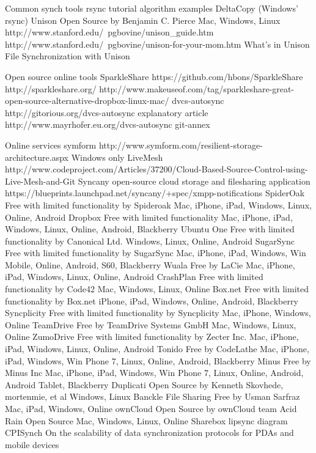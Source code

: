 		Common synch tools
			rsync
				tutorial
				algorithm 
				examples
			DeltaCopy (Windows' rsync)		
			Unison
				Open Source by Benjamin C. Pierce 
				Mac, Windows, Linux
				http://www.stanford.edu/~pgbovine/unison_guide.htm
				http://www.stanford.edu/~pgbovine/unison-for-your-mom.htm
				What’s in Unison
				File Synchronization with Unison
				
		Open source online tools
			SparkleShare 
				https://github.com/hbons/SparkleShare
				http://sparkleshare.org/
				http://www.makeuseof.com/tag/sparkleshare-great-open-source-alternative-dropbox-linux-mac/
			dvcs-autosync
				http://gitorious.org/dvcs-autosync
				explanatory article
				http://www.mayrhofer.eu.org/dvcs-autosync
			git-annex
		
		
		Online services
			symform
			http://www.symform.com/resilient-storage-architecture.aspx
				Windows only
			LiveMesh 
				http://www.codeproject.com/Articles/37200/Cloud-Based-Source-Control-using-Live-Mesh-and-Git
			Syncany
				open-source cloud storage and filesharing application
				https://blueprints.launchpad.net/syncany/+spec/xmpp-notifications 
			SpiderOak
				Free with limited functionality by Spideroak
				Mac, iPhone, iPad, Windows, Linux, Online, Android
			Dropbox
				Free with limited functionality 
				Mac, iPhone, iPad, Windows, Linux, Online, Android, Blackberry
			Ubuntu One
				Free with limited functionality by Canonical Ltd. 
				Windows, Linux, Online, Android
			SugarSync
				Free with limited functionality by SugarSync 
				Mac, iPhone, iPad, Windows, Win Mobile, Online, Android, S60, Blackberry
			Wuala
				Free by LaCie 
				Mac, iPhone, iPad, Windows, Linux, Online, Android
			CrashPlan
				Free with limited functionality by Code42 
				Mac, Windows, Linux, Online
			Box.net
				Free with limited functionality by Box.net
				iPhone, iPad, Windows, Online, Android, Blackberry
			Syncplicity
				Free with limited functionality by Syncplicity
				Mac, iPhone, Windows, Online
			TeamDrive
				Free by TeamDrive Systems GmbH 
				Mac, Windows, Linux, Online
			ZumoDrive
				Free with limited functionality by Zecter Inc.
				Mac, iPhone, iPad, Windows, Linux, Online, Android
			Tonido
				Free by CodeLathe 
				Mac, iPhone, iPad, Windows, Win Phone 7, Linux, Online, Android, Blackberry
			Minus
				Free by Minus Inc 
				Mac, iPhone, iPad, Windows, Win Phone 7, Linux, Online, Android, Android Tablet, Blackberry  
			Duplicati
				Open Source by Kenneth Skovhede, mortenmie, et al 
				Windows, Linux 
			 Banckle File Sharing
				Free by Usman Sarfraz 
				Mac, iPad, Windows, Online
			ownCloud
				Open Source by ownCloud team 
			Acid Rain
				Open Source
				Mac, Windows, Linux, Online 
			Sharebox
			lipsync
				diagram
			CPISynch 
				On the scalability of data synchronization protocols for PDAs and mobile devices
				
